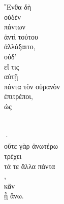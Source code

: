 

{\large
\begin{greek}
\noindent ῎Ενθα δὴ \\
οὐδὲν \\
\tabto{2em} πάντων \\
ἀντὶ τούτου \\
ἀλλάξαιτο, \\
οὐδ' \\
\tabto{2em} εἴ τις \\
\tabto{2em} \tabto{2em} αὐτῇ \\
\tabto{2em} πάντα τὸν οὐρανὸν \\
\tabto{2em} ἐπιτρέποι, \\
ὡς \\
\tabto{2em}  \\
\tabto{4em}  \\
\tabto{4em} · \\
οὔτε γὰρ ἀνωτέρω \\
τρέχει \\
τά τε ἄλλα πάντα \\
, \\
κἂν \\
\tabto{2em} ᾖ ἄνω.\\

\end{greek}
}


